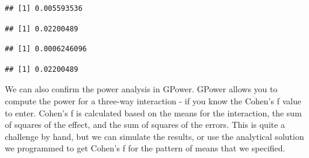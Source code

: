 \documentclass[]{book}
\newenvironment{Shaded}{\begin{snugshade}}{\end{snugshade}}
\newcommand{\CommentTok}[1]{\textcolor[rgb]{0.56,0.35,0.01}{\textit{#1}}}
\newcommand{\DecValTok}[1]{\textcolor[rgb]{0.00,0.00,0.81}{#1}}
\newcommand{\NormalTok}[1]{#1}
\newcommand{\OperatorTok}[1]{\textcolor[rgb]{0.81,0.36,0.00}{\textbf{#1}}}
\begin{document}
\begin{verbatim}
## [1] 0.005593536
\end{verbatim}

\begin{Shaded}
\end{Shaded}

\begin{verbatim}
## [1] 0.02200489
\end{verbatim}

\begin{Shaded}
\end{Shaded}

\begin{verbatim}
## [1] 0.0006246096
\end{verbatim}

\begin{Shaded}
\end{Shaded}

\begin{verbatim}
## [1] 0.02200489
\end{verbatim}

We can also confirm the power analysis in GPower. GPower allows you to compute the power for a three-way interaction - if you know the Cohen's f value to enter. Cohen's f is calculated based on the means for the interaction, the sum of squares of the effect, and the sum of squares of the errors. This is quite a challenge by hand, but we can simulate the results, or use the analytical solution we programmed to get Cohen's f for the pattern of means that we specified.

\begin{Shaded}
\end{Shaded}
\end{document}
